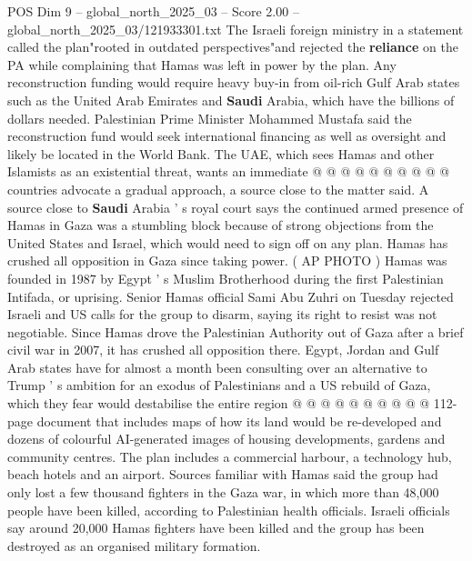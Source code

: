 \begin{textsample}{POS Dim 9 – global\_north\_2025\_03 – Score 2.00 – global\_north\_2025\_03/121933301.txt}
The Israeli foreign ministry in a statement called the plan"rooted in outdated perspectives"and rejected the \textbf{reliance} on the PA while complaining that Hamas was left in power by the plan.
Any reconstruction funding would require heavy buy-in from oil-rich Gulf Arab states such as the United Arab Emirates and \textbf{Saudi} Arabia, which have the billions of dollars needed.
Palestinian Prime Minister Mohammed Mustafa said the reconstruction fund would seek international financing as well as oversight and likely be located in the World Bank.
The UAE, which sees Hamas and other Islamists as an existential threat, wants an immediate @ @ @ @ @ @ @ @ @ @ countries advocate a gradual approach, a source close to the matter said.
A source close to \textbf{Saudi} Arabia ' s royal court says the continued armed presence of Hamas in Gaza was a stumbling block because of strong objections from the United States and Israel, which would need to sign off on any plan.
Hamas has crushed all opposition in Gaza since taking power. ( AP PHOTO ) Hamas was founded in 1987 by Egypt ' s Muslim Brotherhood during the first Palestinian Intifada, or uprising.
Senior Hamas official Sami Abu Zuhri on Tuesday rejected Israeli and US calls for the group to disarm, saying its right to resist was not negotiable.
Since Hamas drove the Palestinian Authority out of Gaza after a brief civil war in 2007, it has crushed all opposition there.
Egypt, Jordan and Gulf Arab states have for almost a month been consulting over an alternative to Trump ' s ambition for an exodus of Palestinians and a US rebuild of Gaza, which they fear would destabilise the entire region @ @ @ @ @ @ @ @ @ @ 112-page document that includes maps of how its land would be re-developed and dozens of colourful AI-generated images of housing developments, gardens and community centres.
The plan includes a commercial harbour, a technology hub, beach hotels and an airport.
Sources familiar with Hamas said the group had only lost a few thousand fighters in the Gaza war, in which more than 48,000 people have been killed, according to Palestinian health officials.
Israeli officials say around 20,000 Hamas fighters have been killed and the group has been destroyed as an organised military formation.

\end{textsample}
